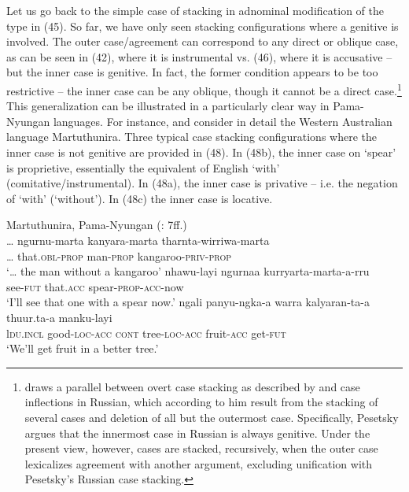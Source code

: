 \documentclass[output=paper]{langsci/langscibook}
\begin{document}
Let us go back to the simple case of stacking in adnominal modification of the type in (45). So far, we have only seen stacking configurations where a genitive is involved. The outer case/agreement can correspond to any direct or oblique case, as can be seen in (42), where it is instrumental vs. (46), where it is accusative – but the inner case is genitive. In fact, the former condition appears to be too restrictive – the inner case can be any oblique, though it cannot be a direct case.\footnote{\citet{Pesetsky2013} draws a parallel between overt case stacking as described by \citet{Richards2013} and case inflections in Russian, which according to him result from the stacking of several cases and deletion of all but the outermost case. Specifically, Pesetsky argues that the innermost case in Russian is always genitive. Under the present view, however, cases are stacked, recursively, when the outer case lexicalizes agreement with another argument, excluding unification with Pesetsky’s Russian case stacking.}  This generalization can be illustrated in a particularly clear way in Pama-Nyungan languages. For instance, \citet{Dench1988} and \citet{Dench1995} consider in detail the Western Australian language Martuthunira. Three typical case stacking configurations where the inner case is not genitive are provided in (48). In (48b), the inner case on ‘spear’ is proprietive, essentially the equivalent of English ‘with’ (comitative/instrumental). In (48a), the inner case is privative – i.e. the negation of ‘with’ (‘without’). In (48c) the inner case is locative. 

\ea%
    Martuthunira, Pama-Nyungan (\citealt{Dench1988}: 7ff.)\label{ex:manzini:48}\\
    \ea
    \gll … ngurnu-marta   kanyara-marta  tharnta-wirriwa-marta    \\
         … that.\textsc{obl-prop}   man-\textsc{prop}   kangaroo-\textsc{priv-prop}\\
    \glt ‘… the man without a kangaroo’
    \ex  
    \gll  nhawu-layi   ngurnaa  kurryarta-marta-a-rru    \\
         see-\textsc{fut}   that.\textsc{acc}   spear-\textsc{prop-acc}{}-now\\
    \glt ‘I'll see that one with a spear now.’
    \ex  
    \gll ngali   panyu-ngka-a   warra  kalyaran-ta-a   thuur.ta-a   manku-layi\\
         l\textsc{du.incl}   good-\textsc{loc-acc  cont}   tree-\textsc{loc-acc}   fruit-\textsc{acc}   get-\textsc{fut}\\
    \glt ‘We'll get fruit in a better tree.’ 
    \z
\z 
\end{document}
